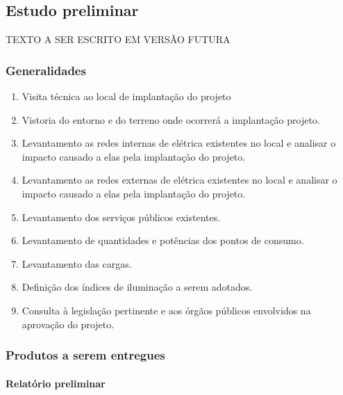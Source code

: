 \subsection{Estudo preliminar} \label{subsection: estudo preliminar}

TEXTO A SER ESCRITO EM VERSÃO FUTURA

\subsubsection{Generalidades}

	\begin{enumerate}\label{subsection: EP-generalidades}
		\item Visita técnica ao local de implantação do projeto

		\item Vistoria do entorno e do terreno onde ocorrerá a implantação projeto.
		
		\item Levantamento as redes internas de elétrica existentes no local e analisar o impacto causado a elas pela implantação do projeto. 
		
		\item Levantamento as redes externas de elétrica existentes no local e analisar o impacto causado a elas pela implantação do projeto.
		
		\item Levantamento dos serviços públicos existentes.

		\item Levantamento de quantidades e potências dos pontos de consumo.

		\item Levantamento das cargas.		

		\item Definição dos índices de iluminação a serem adotados.
		
		\item Consulta à legislação pertinente e aos órgãos públicos envolvidos na aprovação do projeto.
	\end{enumerate}
\subsubsection{Produtos a serem entregues}

\paragraph{Relatório preliminar}

